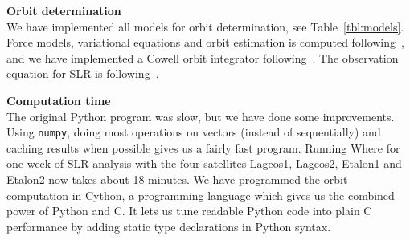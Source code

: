 {\large\bfseries Orbit determination}\\

We have implemented all models for orbit determination, see
Table~\ref{tbl:models}. Force models, variational equations and orbit
estimation is computed following~\cite{montenbruck2012}, and we have
implemented a Cowell orbit integrator following~\cite{oesterwinter1972}. The
observation equation for SLR is following~\cite{beutler2005}.  


{\large\bfseries Computation time}\\

The original Python program was slow, but we have done some improvements. Using
\texttt{numpy}, doing most operations on vectors (instead of sequentially) and
caching results when possible gives us a fairly fast program. Running Where for
one week of SLR analysis with the four satellites Lageos1, Lageos2, Etalon1 and
Etalon2 now takes about 18 minutes. We have programmed the orbit computation in
Cython, a programming language which gives us the combined power of Python and
C. It lets us tune readable Python code into plain C performance by adding
static type declarations in Python syntax. 

\endinput
